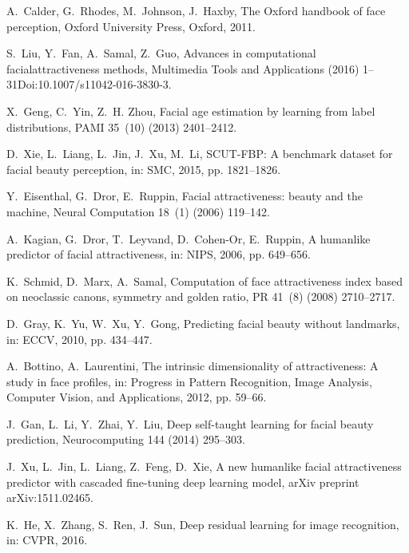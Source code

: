 \documentclass[preprint,5p,times,twocolumn]{elsarticle}
\begin{document}
\begin{thebibliography}{}

A.~Calder, G.~Rhodes, M.~Johnson, J.~Haxby, The Oxford handbook of face
  perception, Oxford University Press, Oxford, 2011.

S.~Liu, Y.~Fan, A.~Samal, Z.~Guo, Advances in computational
  facialattractiveness methods, Multimedia Tools and Applications (2016)
  1--31Doi:10.1007/s11042-016-3830-3.

X.~Geng, C.~Yin, Z.~H. Zhou, Facial age estimation by learning from label
  distributions, PAMI 35~(10) (2013) 2401--2412.

D.~Xie, L.~Liang, L.~Jin, J.~Xu, M.~Li, \textsc{SCUT-FBP}: A benchmark dataset
  for facial beauty perception, in: SMC, 2015, pp. 1821--1826.

Y.~Eisenthal, G.~Dror, E.~Ruppin, Facial attractiveness: beauty and the
  machine, Neural Computation 18~(1) (2006) 119--142.

A.~Kagian, G.~Dror, T.~Leyvand, D.~Cohen-Or, E.~Ruppin, A humanlike predictor
  of facial attractiveness, in: NIPS, 2006, pp. 649--656.

K.~Schmid, D.~Marx, A.~Samal, Computation of face attractiveness index based on
  neoclassic canons, symmetry and golden ratio, PR 41~(8) (2008) 2710--2717.

D.~Gray, K.~Yu, W.~Xu, Y.~Gong, Predicting facial beauty without landmarks, in:
  ECCV, 2010, pp. 434--447.

A.~Bottino, A.~Laurentini, The intrinsic dimensionality of attractiveness: A
  study in face profiles, in: Progress in Pattern Recognition, Image Analysis,
  Computer Vision, and Applications, 2012, pp. 59--66.

J.~Gan, L.~Li, Y.~Zhai, Y.~Liu, Deep self-taught learning for facial beauty
  prediction, Neurocomputing 144 (2014) 295--303.

J.~Xu, L.~Jin, L.~Liang, Z.~Feng, D.~Xie, A new humanlike facial attractiveness
  predictor with cascaded fine-tuning deep learning model, arXiv preprint
  arXiv:1511.02465.

K.~He, X.~Zhang, S.~Ren, J.~Sun, Deep residual learning for image recognition,
  in: CVPR, 2016.


\end{thebibliography}
\end{document}
